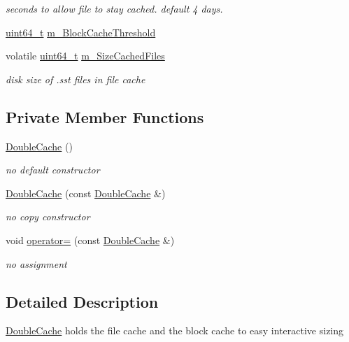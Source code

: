 \begin{DoxyCompactItemize}
\begin{DoxyCompactList}\small\item\em seconds to allow file to stay cached. default 4 days. \end{DoxyCompactList}\item 
\hyperlink{stdint_8h_aaa5d1cd013383c889537491c3cfd9aad}{uint64\+\_\+t} \hyperlink{classleveldb_1_1_double_cache_ae08930d00eff9d2423cbe49875fc2fff}{m\+\_\+\+Block\+Cache\+Threshold}
\item 
volatile \hyperlink{stdint_8h_aaa5d1cd013383c889537491c3cfd9aad}{uint64\+\_\+t} \hyperlink{classleveldb_1_1_double_cache_ab1c67e0adcd9a23eb0bef43d32f24c98}{m\+\_\+\+Size\+Cached\+Files}
\begin{DoxyCompactList}\small\item\em disk size of .sst files in file cache \end{DoxyCompactList}\end{DoxyCompactItemize}
\subsection*{Private Member Functions}
\begin{DoxyCompactItemize}
\item 
\hyperlink{classleveldb_1_1_double_cache_aa9f5530c03176ec151019219a72164d2}{Double\+Cache} ()
\begin{DoxyCompactList}\small\item\em no default constructor \end{DoxyCompactList}\item 
\hyperlink{classleveldb_1_1_double_cache_aa143a9b696035b71959918dc61a3335c}{Double\+Cache} (const \hyperlink{classleveldb_1_1_double_cache}{Double\+Cache} \&)
\begin{DoxyCompactList}\small\item\em no copy constructor \end{DoxyCompactList}\item 
void \hyperlink{classleveldb_1_1_double_cache_a8528fb48c236f408dc65a1346e1f4cfd}{operator=} (const \hyperlink{classleveldb_1_1_double_cache}{Double\+Cache} \&)
\begin{DoxyCompactList}\small\item\em no assignment \end{DoxyCompactList}\end{DoxyCompactItemize}


\subsection{Detailed Description}
\hyperlink{classleveldb_1_1_double_cache}{Double\+Cache} holds the file cache and the block cache to easy interactive sizing 

